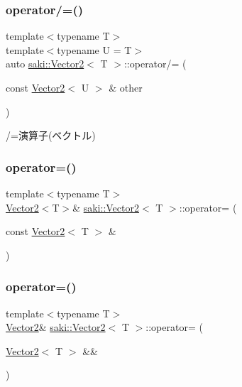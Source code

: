 \subsubsection{\texorpdfstring{operator/=()}{operator/=()}\hspace{0.1cm}{\footnotesize\ttfamily [2/2]}}
{\footnotesize\ttfamily template$<$typename T$>$ \\
template$<$typename U  = T$>$ \\
auto \mbox{\hyperlink{classsaki_1_1_vector2}{saki\+::\+Vector2}}$<$ T $>$\+::operator/= (\begin{DoxyParamCaption}\item[{const \mbox{\hyperlink{classsaki_1_1_vector2}{Vector2}}$<$ U $>$ \&}]{other }\end{DoxyParamCaption})\hspace{0.3cm}{\ttfamily [inline]}}



/=演算子(ベクトル) 

\mbox{\label{classsaki_1_1_vector2_ae6ee2a6387bfe58bdd5bf74d388370a9}} 
\subsubsection{\texorpdfstring{operator=()}{operator=()}\hspace{0.1cm}{\footnotesize\ttfamily [1/2]}}
{\footnotesize\ttfamily template$<$typename T$>$ \\
\mbox{\hyperlink{classsaki_1_1_vector2}{Vector2}}$<$T$>$\& \mbox{\hyperlink{classsaki_1_1_vector2}{saki\+::\+Vector2}}$<$ T $>$\+::operator= (\begin{DoxyParamCaption}\item[{const \mbox{\hyperlink{classsaki_1_1_vector2}{Vector2}}$<$ T $>$ \&}]{ }\end{DoxyParamCaption})\hspace{0.3cm}{\ttfamily [default]}}

\mbox{\label{classsaki_1_1_vector2_a56cf093f36e7949a9c56df42a9660f38}} 
\subsubsection{\texorpdfstring{operator=()}{operator=()}\hspace{0.1cm}{\footnotesize\ttfamily [2/2]}}
{\footnotesize\ttfamily template$<$typename T$>$ \\
\mbox{\hyperlink{classsaki_1_1_vector2}{Vector2}}\& \mbox{\hyperlink{classsaki_1_1_vector2}{saki\+::\+Vector2}}$<$ T $>$\+::operator= (\begin{DoxyParamCaption}\item[{\mbox{\hyperlink{classsaki_1_1_vector2}{Vector2}}$<$ T $>$ \&\&}]{ }\end{DoxyParamCaption})\hspace{0.3cm}{\ttfamily [default]}}

